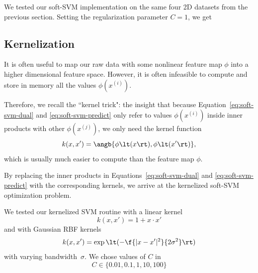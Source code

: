 \documentclass{article}
\newcommand{\sind}[1]{^{(#1)}}
\begin{document}
\begin{multicols}{2}

We tested our soft-SVM implementation
on the same four 2D datasets from the previous section.
Setting the regularization parameter $C=1$,
we get %


\subsection{Kernelization}

It is often useful to map our raw data
with some nonlinear feature map $\phi$
into a higher dimensional feature space.
However, it is often infeasible to compute and store in memory
all the values $\phi(x\sind{i})$.

Therefore, we recall the ``kernel trick": the insight that
because Equation~\ref{eq:soft-svm-dual} and \ref{eq:soft-svm-predict}
only refer to values $\phi(x\sind{i})$ inside inner products
with other $\phi(x\sind{j})$,
we only need the kernel function
\begin{equation}
    k(x, x') = \angb{\phi\lt(x\rt), \phi\lt(x'\rt)},
\end{equation}
which is usually much easier to compute than the feature map $\phi$.

By replacing the inner products in
Equations~\ref{eq:soft-svm-dual} and \ref{eq:soft-svm-predict}
with the corresponding kernels,
we arrive at the kernelized soft-SVM optimization problem.

We tested our kernelized SVM routine with a linear kernel
\begin{equation}
    k(x, x') = 1 + x\cdot x'
\end{equation}
and with Gaussian RBF kernels
\begin{equation}
    k(x, x') = \exp\lt(-\f{|x - x'|^2}{2\sigma^2}\rt)
\end{equation}
with varying bandwidth~$\sigma$.  %
We chose values of $C$ in
\[
    C \in \{0.01, 0.1, 1, 10, 100\}
\]

%
%




\end{multicols}
\end{document}
